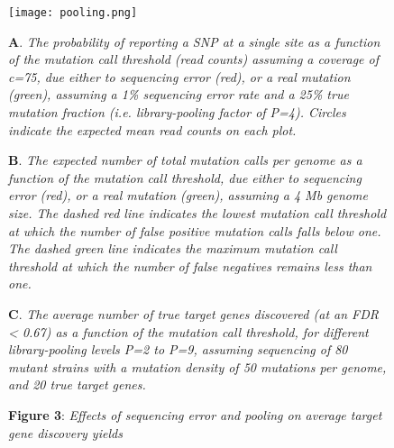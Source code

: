 \documentclass[letterpaper,10pt,english]{howto}
\begin{document}
\hypertarget{poolingfig}{}\begin{figure}[htbp]
\centering

\texttt{[image: pooling.png]}
\caption{\textbf{Figure 3}: \emph{Effects of sequencing error and pooling on average target gene discovery yields}}{\small 
\textbf{A}. \emph{The probability of reporting a SNP at a single site
as a function of the mutation call threshold (read counts)
assuming a coverage of c=75, due either to sequencing error
(red), or a real mutation (green), assuming a 1\% sequencing
error rate and a 25\% true mutation fraction (i.e. library-pooling
factor of P=4).  Circles indicate the expected mean read
counts on each plot.}

\textbf{B}. \emph{The expected number of total mutation calls per genome
as a function of the mutation call threshold,
due either to sequencing error
(red), or a real mutation (green), assuming a 4 Mb genome size.
The dashed red line indicates the lowest mutation call threshold
at which the number of false positive mutation calls falls below
one.  The dashed green line indicates the maximum mutation call
threshold at which the number of false negatives remains less
than one.}

\textbf{C}. \emph{The average number of true target genes discovered
(at an FDR \textless{} 0.67) as a function of the mutation call threshold,
for different library-pooling
levels P=2 to P=9, assuming sequencing of 80 mutant strains with
a mutation density of 50 mutations
per genome, and 20 true target genes.}
}\end{figure}
\end{document}
